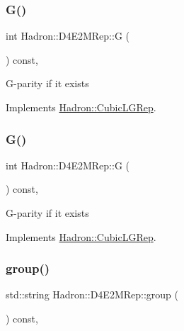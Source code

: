 \subsubsection{\texorpdfstring{G()}{G()}\hspace{0.1cm}{\footnotesize\ttfamily [2/3]}}
{\footnotesize\ttfamily int Hadron\+::\+D4\+E2\+M\+Rep\+::G (\begin{DoxyParamCaption}{ }\end{DoxyParamCaption}) const\hspace{0.3cm}{\ttfamily [inline]}, {\ttfamily [virtual]}}

G-\/parity if it exists 

Implements \mbox{\hyperlink{structHadron_1_1CubicLGRep_ace26f7b2d55e3a668a14cb9026da5231}{Hadron\+::\+Cubic\+L\+G\+Rep}}.

\mbox{\label{structHadron_1_1D4E2MRep_a8864f10fd71c4df8470c772f597564f6}} 
\subsubsection{\texorpdfstring{G()}{G()}\hspace{0.1cm}{\footnotesize\ttfamily [3/3]}}
{\footnotesize\ttfamily int Hadron\+::\+D4\+E2\+M\+Rep\+::G (\begin{DoxyParamCaption}{ }\end{DoxyParamCaption}) const\hspace{0.3cm}{\ttfamily [inline]}, {\ttfamily [virtual]}}

G-\/parity if it exists 

Implements \mbox{\hyperlink{structHadron_1_1CubicLGRep_ace26f7b2d55e3a668a14cb9026da5231}{Hadron\+::\+Cubic\+L\+G\+Rep}}.

\mbox{\label{structHadron_1_1D4E2MRep_ac61a62d44384cf423d191db25dc0bc62}} 
\subsubsection{\texorpdfstring{group()}{group()}\hspace{0.1cm}{\footnotesize\ttfamily [1/3]}}
{\footnotesize\ttfamily std\+::string Hadron\+::\+D4\+E2\+M\+Rep\+::group (\begin{DoxyParamCaption}{ }\end{DoxyParamCaption}) const\hspace{0.3cm}{\ttfamily [inline]}, {\ttfamily [virtual]}}

